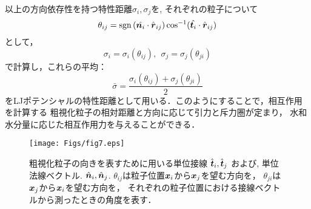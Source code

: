 ﻿\documentclass[11pt,a4j]{jarticle}
\begin{document}
以上の方向依存性を持つ特性距離$\sigma_i,\sigma_j$を,
それぞれの粒子について
\begin{equation}
	\theta_{ij}={\rm sgn} \left(\hat{\mbox{\boldmath $n$}_i}\cdot\hat{\mbox{\boldmath $r$}}_{ij} \right) 
	\cos^{-1}(\hat{\mbox{\boldmath $t$}_i}\cdot \hat{\mbox{\boldmath $r$}}_{ij})
	\label{eqn:def_thij}
\end{equation}
として，
\begin{equation}
	\sigma_i=\sigma_i(\theta_{ij}), \ \
	\sigma_j=\sigma_j(\theta_{ji})
	\label{eqn:def_thi_thj}
\end{equation}
で計算し，これらの平均：
\begin{equation}
	\bar \sigma= \frac{\sigma_i(\theta_{ij})+\sigma_j(\theta_{ji})}{2}
	\label{eqn:def_thb}
\end{equation}
をLJポテンシャルの特性距離として用いる．このようにすることで，相互作用を計算する
粗視化粒子の相対距離と方向に応じて引力と斥力圏が定まり，
水和水分量に応じた相互作用力を与えることができる．
\begin{figure}[h]
	\begin{center}
	\texttt{[image: Figs/fig7.eps]} 
	\end{center}
	\caption{
		粗視化粒子の向きを表すために用いる単位接線
		$\hat{\mbox{\boldmath $t$}}_i,\hat{\mbox{\boldmath $t$}}_j$
		および, 単位法線ベクトル.
		$\hat{\mbox{\boldmath $n$}}_i,\hat{\mbox{\boldmath $n$}}_j$. 
		$\theta_{ij}$は粒子位置$\mbox{\boldmath $x$}_i$から$\mbox{\boldmath $x$}_j$を望む方向を，
		$\theta_{ji}$は$\mbox{\boldmath $x$}_j$から$\mbox{\boldmath $x$}_i$を望む方向を，
		それぞれの粒子位置における接線ベクトルから測ったときの角度を表す．
	} 
	\label{fig:fig9}
\end{figure}
\end{document}
